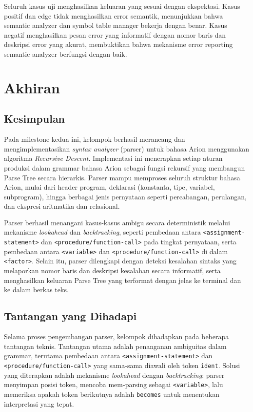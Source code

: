 ﻿\documentclass[12pt,a4paper]{article}
\begin{document}
Seluruh kasus uji menghasilkan keluaran yang sesuai dengan ekspektasi. Kasus positif dan edge tidak menghasilkan error semantik, menunjukkan bahwa semantic analyzer dan symbol table manager bekerja dengan benar. Kasus negatif menghasilkan pesan error yang informatif dengan nomor baris dan deskripsi error yang akurat, membuktikan bahwa mekanisme error reporting semantic analyzer berfungsi dengan baik.

\section{Akhiran}

\subsection{Kesimpulan}
Pada milestone kedua ini, kelompok berhasil merancang dan mengimplementasikan
\textit{syntax analyzer} (parser) untuk bahasa Arion menggunakan algoritma
\textit{Recursive Descent}. Implementasi ini menerapkan setiap aturan produksi
dalam grammar bahasa Arion sebagai fungsi rekursif yang membangun Parse Tree
secara hierarkis. Parser mampu memproses seluruh struktur bahasa Arion, mulai
dari header program, deklarasi (konstanta, tipe, variabel, subprogram), hingga
berbagai jenis pernyataan seperti percabangan, perulangan, dan ekspresi
aritmatika dan relasional.

Parser berhasil menangani kasus-kasus ambigu secara deterministik melalui
mekanisme \textit{lookahead} dan \textit{backtracking}, seperti pembedaan antara
\texttt{<assignment-statement>} dan \texttt{<procedure/function-call>} pada
tingkat pernyataan, serta pembedaan antara \texttt{<variable>} dan
\texttt{<procedure/function-call>} di dalam \texttt{<factor>}. Selain itu,
parser dilengkapi dengan deteksi kesalahan sintaks yang melaporkan nomor baris
dan deskripsi kesalahan secara informatif, serta menghasilkan keluaran Parse
Tree yang terformat dengan jelas ke terminal dan ke dalam berkas teks.

\subsection{Tantangan yang Dihadapi}
Selama proses pengembangan parser, kelompok dihadapkan pada beberapa tantangan
teknis. Tantangan utama adalah penanganan ambiguitas dalam grammar, terutama
pembedaan antara \texttt{<assignment-statement>} dan
\texttt{<procedure/function-call>} yang sama-sama diawali oleh token
\texttt{ident}. Solusi yang diterapkan adalah mekanisme \textit{lookahead}
dengan \textit{backtracking}: parser menyimpan posisi token, mencoba mem-parsing
sebagai \texttt{<variable>}, lalu memeriksa apakah token berikutnya adalah
\texttt{becomes} untuk menentukan interpretasi yang tepat.
\end{document}
